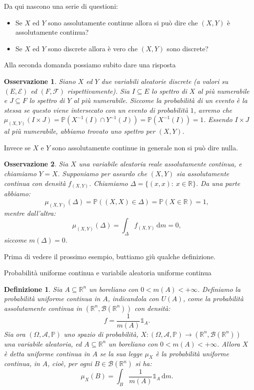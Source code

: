\documentclass[11pt]{book}
\theoremstyle{Definizione}
\newtheorem*{mydef}{Definizione}
\theoremstyle{TeoremaProposizioneLemmaCorollario}
\theoremstyle{OsservazioneNota}
\newtheorem{myobs}{Osservazione}[section]
\newcommand{\R}{\mathbb{R}}
\renewcommand{\P}{\mathbb{P}}
\renewcommand{\d}{\mathrm{d}}
\newcommand{\dm}{\,\d \textit{m}}
\newcommand{\uno}[1]{\mathds{1}_{#1}}
\begin{document}
\noindent
Da qui nascono una serie di questioni:
\begin{itemize}
\item Se $X$ ed $Y$ sono assolutamente continue allora si può dire che $(X,Y)$ è assolutamente continua?
\item Se $X$ ed $Y$ sono discrete allora è vero che $(X,Y)$ sono discrete?
\end{itemize}
Alla seconda domanda possiamo subito dare una risposta
\begin{myobs}
Siano $X$ ed $Y$ due variabili aleatorie discrete (a valori su $(E,\mathcal{E})$ ed $(F,\mathcal{F})$ rispettivamente). Sia $I\subseteq E$ lo spettro di $X$ al più numerabile e $J\subseteq F$ lo spettro di $Y$ al più numerabile. Siccome la probabilità di un evento è la stessa se questo viene intersecato con un evento di probabilità $1$, avremo che $\mu_{(X,Y)}(I\times J) = \P(X^{-1}(I)\cap Y^{-1}(J)) = \P(X^{-1}(I)) = 1$. Essendo $I\times J$ al più numerabile, abbiamo trovato uno spettro per $(X,Y)$.
\end{myobs}
Invece se $X$ e $Y$ sono assolutamente continue in generale non si può dire nulla.
\begin{myobs}
Sia $X$ una variabile aleatoria reale assolutamente continua, e chiamiamo $Y = X$. Supponiamo per assurdo che $(X,Y)$ sia assolutamente continua con densità $f_{(X,Y)}$. Chiamiamo $\Delta = \{(x,x):\ x\in \R\}$. Da una parte abbiamo:
$$
\mu_{(X,Y)}(\Delta) = \P((X,X)\in \Delta) = \P(X\in \R) = 1,
$$
mentre dall'altra:
$$
\mu_{(X,Y)}(\Delta) = \int_{\Delta} f_{(X,Y)}\dm = 0,
$$
siccome $m(\Delta) = 0$.
\end{myobs}
Prima di vedere il prossimo esempio, buttiamo giù qualche definizione.
\begin{boxdef}{Probabilità uniforme continua e variabile aleatoria uniforme continua}
\begin{mydef}
Sia $A\subseteq \R^n$ un boreliano con $0< m(A) < +\infty$. Definiamo la probabilità uniforme continua in $A$, indicandola con $U(A)$, come la probabilità assolutamente continua in $(\R^n,\mathcal{B}(\R^n))$ con densità:
$$
f = \frac{1}{m(A)} \uno{A}.
$$
Sia ora $(\Omega,\mathcal{A},\P)$ uno spazio di probabilità, $X:(\Omega,\mathcal{A},\P)\longrightarrow (\R^n,\mathcal{B}(\R^n))$ una variabile aleatoria, ed $A\subseteq \R^n$ un boreliano con $0< m(A) < +\infty$. Allora $X$ è detta uniforme continua in $A$ se la sua legge $\mu_X$ è la probabilità uniforme continua, in $A$, cioè, per ogni $B\in \mathcal{B}(\R^n)$ si ha:
$$
\mu_X(B) = \int_{B} \frac{1}{m(A)}\uno{A}\dm.
$$
\end{mydef}
\end{boxdef}
\end{document}
